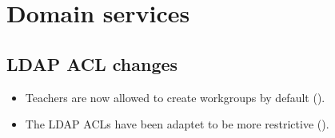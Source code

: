 \section{Domain services}


\subsection{LDAP ACL changes}
\begin{itemize}
\item Teachers are now allowed to create workgroups by default ().
\item The LDAP ACLs have been adaptet to be more restrictive ().
\end{itemize}
 




%


